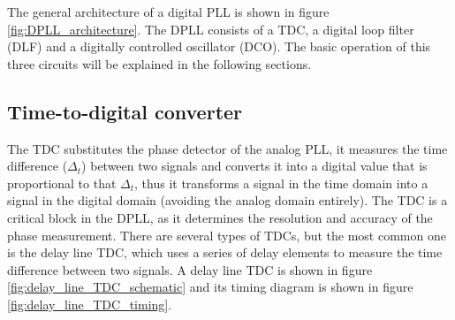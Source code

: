 The general architecture of a digital PLL is shown in figure \ref{fig:DPLL_architecture}. The DPLL consists of a TDC, a digital loop filter (DLF) and a digitally controlled oscillator (DCO).
The basic operation of this three circuits will be explained in the following sections.

\begin{center}
    \label{fig:DPLL_architecture}
\end{center}

\subsection{Time-to-digital converter}

The TDC substitutes the phase detector of the analog PLL, it measures the time difference ($\Delta_t$) between two signals and converts it into a digital value that is proportional to 
that $\Delta_t$, thus it transforms a signal in the time domain into a signal in the digital domain (avoiding the analog domain entirely). The TDC is a critical block in the DPLL, as 
it determines the resolution and accuracy of the phase measurement. There are several types of TDCs, but the most common one is the delay line TDC, which uses a series of delay elements
to measure the time difference between two signals. A delay line TDC is shown in figure \ref{fig:delay_line_TDC_schematic} and its timing diagram is shown in figure \ref{fig:delay_line_TDC_timing}.

